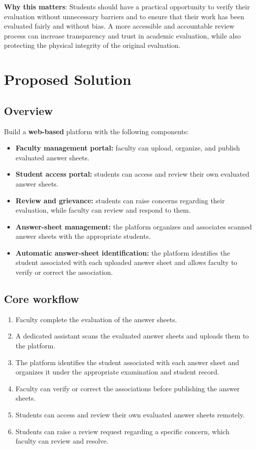 \documentclass[11pt,a4paper]{article}
\begin{document}
\textbf{Why this matters}: Students should have a practical opportunity to verify their evaluation without unnecessary barriers and to ensure that their work has been evaluated fairly and without bias. A more accessible and accountable review process can increase transparency and trust in academic evaluation, while also protecting the physical integrity of the original evaluation.

\section{Proposed Solution}
\subsection{Overview}
Build a \textbf{web-based} platform with the following components:
\begin{itemize}[leftmargin=0.7cm]
    \item \textbf{Faculty management portal:} faculty can upload, organize, and publish evaluated answer sheets.
    \item \textbf{Student access portal:} students can access and review their own evaluated answer sheets.
    \item \textbf{Review and grievance:} students can raise concerns regarding their evaluation, while faculty can review and respond to them.
    \item \textbf{Answer-sheet management:} the platform organizes and associates scanned answer sheets with the appropriate students.
    \item \textbf{Automatic answer-sheet identification:} the platform identifies the student associated with each uploaded answer sheet and allows faculty to verify or correct the association.
\end{itemize}

\subsection{Core workflow}
\begin{enumerate}[leftmargin=0.7cm]
    \item Faculty complete the evaluation of the answer sheets.
    \item A dedicated assistant scans the evaluated answer sheets and uploads them to the platform.
    \item The platform identifies the student associated with each answer sheet and organizes it under the appropriate examination and student record.
    \item Faculty can verify or correct the associations before publishing the answer sheets.
    \item Students can access and review their own evaluated answer sheets remotely.
    \item Students can raise a review request regarding a specific concern, which faculty can review and resolve.
\end{enumerate}
\end{document}
